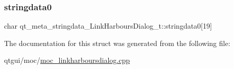 \subsubsection{\texorpdfstring{stringdata0}{stringdata0}}
{\footnotesize\ttfamily char qt\+\_\+meta\+\_\+stringdata\+\_\+\+Link\+Harbours\+Dialog\+\_\+t\+::stringdata0\mbox{[}19\mbox{]}}



The documentation for this struct was generated from the following file\+:\begin{DoxyCompactItemize}
\item 
qtgui/moc/\mbox{\hyperlink{moc__linkharboursdialog_8cpp}{moc\+\_\+linkharboursdialog.\+cpp}}\end{DoxyCompactItemize}
